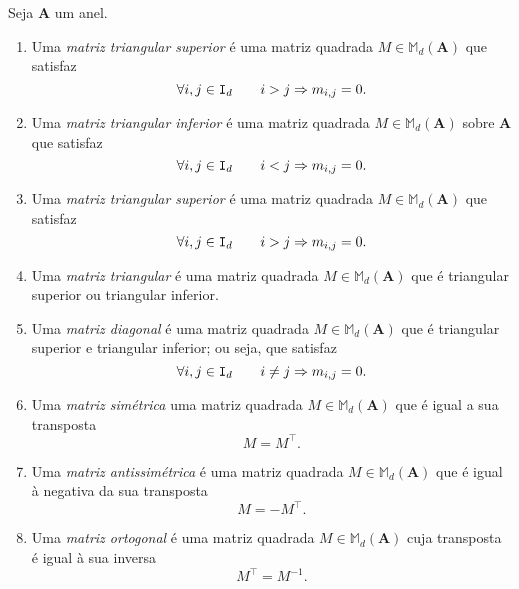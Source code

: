 \begin{defi}
	Seja $\bm A$ um anel.
	\begin{enumerate}
	\item Uma \emph{matriz triangular superior} é uma matriz quadrada $M \in \mathbb M_d(\bm A)$ que satisfaz
		\begin{equation*}
		\forall i,j \in \mathtt I_d \qquad i > j \Rightarrow m_{i,j}=0.
		\end{equation*}
	\item Uma \emph{matriz triangular inferior} é uma matriz quadrada $M \in \mathbb M_d(\bm A)$ sobre $\bm A$ que satisfaz
		\begin{equation*}
		\forall i,j \in \mathtt I_d \qquad i < j \Rightarrow m_{i,j}=0.
		\end{equation*}
	\item Uma \emph{matriz triangular superior} é uma matriz quadrada $M \in \mathbb M_d(\bm A)$ que satisfaz
		\begin{equation*}
		\forall i,j \in \mathtt I_d \qquad i > j \Rightarrow m_{i,j}=0.
		\end{equation*}
	\item Uma \emph{matriz triangular} é uma matriz quadrada $M \in \mathbb M_d(\bm A)$ que é triangular superior ou triangular inferior.
	\item Uma \emph{matriz diagonal} é uma matriz quadrada $M \in \mathbb M_d(\bm A)$ que é triangular superior e triangular inferior; ou seja, que satisfaz
		\begin{equation*}
		\forall i,j \in \mathtt I_d \qquad i \neq j \Rightarrow m_{i,j}=0.
		\end{equation*}
	\item Uma \emph{matriz simétrica}  uma matriz quadrada $M \in \mathbb M_d(\bm A)$ que é igual a sua transposta
		\begin{equation*}
		M = M^\intercal.
		\end{equation*}
	\item Uma \emph{matriz antissimétrica} é uma matriz quadrada $M \in \mathbb M_d(\bm A)$ que é igual à negativa da sua transposta
		\begin{equation*}
		M = -M^\intercal.
		\end{equation*}
	\item Uma \emph{matriz ortogonal} é uma matriz quadrada $M \in \mathbb M_d(\bm A)$ cuja transposta é igual à sua inversa
		\begin{equation*}
		M^\intercal = M^{-1}.
		\end{equation*}
	\end{enumerate}
\end{defi}

